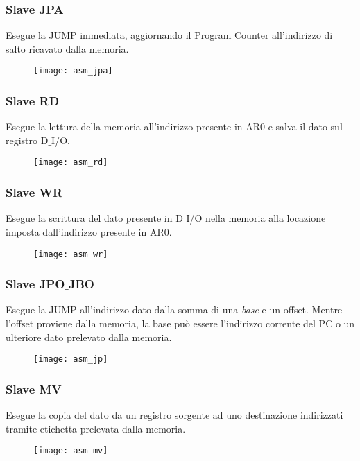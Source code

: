 \newpage
\subsubsection{Slave JPA}
Esegue la JUMP immediata, aggiornando il Program Counter all'indirizzo di salto ricavato dalla memoria.
\begin{figure}[H]
	\centering
	\texttt{[image: asm\_jpa]}
	\label{fig:asm_jpa}
\end{figure}

\newpage
\subsubsection{Slave RD}
Esegue la lettura della memoria all'indirizzo presente in AR0 e salva il dato sul registro D$\_$I/O.
\begin{figure}[H]
	\centering
	\texttt{[image: asm\_rd]}
	\label{fig:asm_rd}
\end{figure}

\newpage
\subsubsection{Slave WR}
Esegue la scrittura del dato presente in D$\_$I/O nella memoria alla locazione imposta dall'indirizzo presente in AR0.
\begin{figure}[H]
\centering
\texttt{[image: asm\_wr]}
\label{fig:asm_wr}
\end{figure}

\newpage
\subsubsection{Slave JPO$\_$JBO}
Esegue la JUMP all'indirizzo dato dalla somma di una \textit{base} e un offset. Mentre l'offset proviene dalla memoria, la base può essere l'indirizzo corrente del PC o un ulteriore dato prelevato dalla memoria.
\begin{figure}[H]
	\centering
	\texttt{[image: asm\_jp]}
	\label{fig:asm_jp}
\end{figure}

\newpage
\subsubsection{Slave MV}
Esegue la copia del dato da un registro sorgente ad uno destinazione indirizzati tramite etichetta prelevata dalla memoria.
\begin{figure}[H]
	\centering
	\texttt{[image: asm\_mv]}
	\label{fig:asm_mv}
\end{figure}

